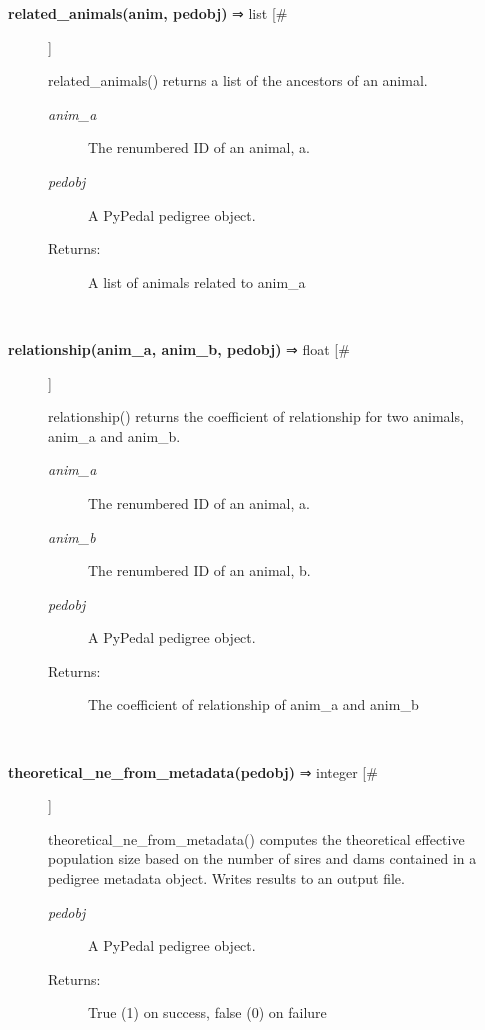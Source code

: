 \documentclass{article}
\begin{document}
\begin{description}
\item[\textbf{related\_animals(anim, pedobj)} ⇒ list [\#]
]
\par related\_animals() returns a list of the ancestors of an animal.
\begin{description}
\item[\textit{anim\_a}
]
The renumbered ID of an animal, a.
\item[\textit{pedobj}
]
A PyPedal pedigree object.
\item[Returns:
]
A list of animals related to anim\_a
\end{description}\\

\item[\textbf{relationship(anim\_a, anim\_b, pedobj)} ⇒ float [\#]
]
\par relationship() returns the coefficient of relationship for two
animals, anim\_a and anim\_b.
\begin{description}
\item[\textit{anim\_a}
]
The renumbered ID of an animal, a.
\item[\textit{anim\_b}
]
The renumbered ID of an animal, b.
\item[\textit{pedobj}
]
A PyPedal pedigree object.
\item[Returns:
]
The coefficient of relationship of anim\_a and anim\_b
\end{description}\\

\item[\textbf{theoretical\_ne\_from\_metadata(pedobj)} ⇒ integer [\#]
]
\par theoretical\_ne\_from\_metadata() computes the theoretical effective population
size based on the number of sires and dams contained in a pedigree metadata
object.  Writes results to an output file.
\begin{description}
\item[\textit{pedobj}
]
A PyPedal pedigree object.
\item[Returns:
]
True (1) on success, false (0) on failure
\end{description}\\

\end{description}
\end{document}
